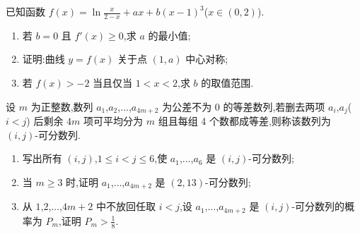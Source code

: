\begin{problem}
已知函数
\(f(x)=\ln\frac{x}{2-x}+ax+b(x-1)^3\)(\(x\in(0,2)\)).
\begin{enumerate}
\item 若 \(b=0\) 且 \(f'(x)\ge0\),求 \(a\) 的最小值;
\item 证明:曲线 \(y=f(x)\) 关于点 \((1,a)\) 中心对称;
\item 若 \(f(x)>-2\) 当且仅当 \(1<x<2\),求 \(b\) 的取值范围.
\end{enumerate}
\end{problem}

\begin{problem}
设 \(m\) 为正整数,数列 \(a_1\),\(a_2\),\(\dots\),\(a_{4m+2}\) 为公差不为 \(0\) 的等差数列,若删去两项 \(a_i\),\(a_j\)(\(i<j\)) 后剩余 \(4m\) 项可平均分为 \(m\) 组且每组 4 个数都成等差,则称该数列为 \((i,j)\)-可分数列.
\begin{enumerate}
\item 写出所有 \((i,j)\),\(1\le i<j\le6\),使 \(a_1\),\(\dots\),\(a_6\) 是 \((i,j)\)-可分数列;
\item 当 \(m\ge3\) 时,证明 \(a_1\),\(\dots\),\(a_{4m+2}\) 是 \((2,13)\)-可分数列;
\item 从 \(1\),\(2\),\(\dots\),\(4m+2\) 中不放回任取 \(i<j\),设 \(a_1\),\(\dots\),\(a_{4m+2}\) 是 \((i,j)\)-可分数列的概率为 \(P_m\),证明 \(P_m>\frac18\).
\end{enumerate}
\end{problem}

